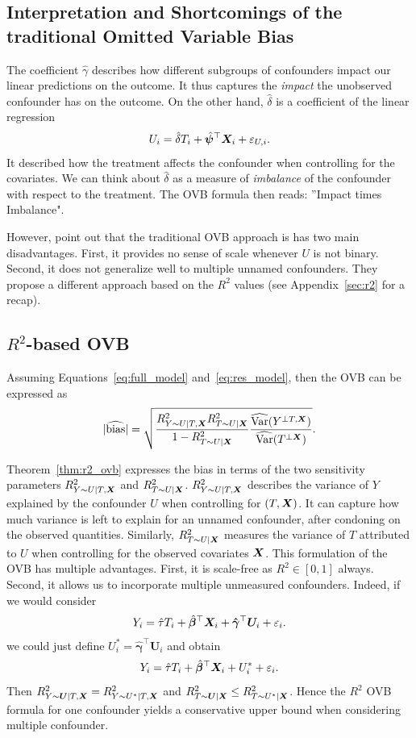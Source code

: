 \documentclass[11pt]{exam}
\begin{document}
\subsection{Interpretation and Shortcomings of the traditional Omitted Variable Bias}
The coefficient $\hat \gamma$ describes how different subgroups of confounders impact our linear predictions on the outcome. It thus captures the \emph{impact} the unobserved confounder has on the outcome.
On the other hand, $\hat \delta$ is a coefficient of the linear regression
\[
    U_i = \hat \delta T_i + \hat{\bm{\psi}}^\top \bm{X}_i + \varepsilon_{U, i}.
\]
It described how the treatment affects the confounder when controlling for the covariates. We can think about $\hat \delta$ as a measure of \emph{imbalance} of the confounder with respect to the treatment. The OVB formula then reads: ''Impact times Imbalance".

However, \citet{cinelli2020making} point out that the traditional OVB approach is has two main disadvantages. First, it provides no sense of scale whenever $U$ is not binary. Second, it does not generalize well to multiple unnamed confounders. They propose a different approach based on the $R^2$ values (see Appendix~\ref{sec:r2} for a recap).

\subsection{$R^2$-based OVB}
\begin{theorem}\label{thm:r2_ovb}
    Assuming Equations~\eqref{eq:full_model} and~\eqref{eq:res_model}, then the OVB can be expressed as
    \[
        |\widehat{\mathrm{bias}}| = \sqrt{\frac{R^2_{Y \sim U \mid T, \bm{X}} R^2_{T \sim U \mid\bm{X}}}{1 - R^2_{T \sim U \mid\bm{X}}} \frac{\widehat{\mathrm{Var}}(Y^{\perp T, \bm{X}})}{\widehat{\mathrm{Var}}(T^{\perp \bm{X}})}}.
    \]
\end{theorem}
Theorem~\ref{thm:r2_ovb} expresses the bias in terms of the two sensitivity parameters $R^2_{Y \sim U \mid T, \bm{X}}$ and $R^2_{T \sim U \mid\bm{X}}$. $R^2_{Y \sim U \mid T, \bm{X}}$ describes the variance of $Y$ explained by the confounder $U$ when controlling for $(T, \bm{X})$. It can capture how much variance is left to explain for an unnamed confounder, after condoning on the observed quantities. Similarly, $R^2_{T \sim U \mid\bm{X}}$ measures the variance of $T$ attributed to $U$ when controlling for the observed covariates $\bm{X}$.
This formulation of the OVB has multiple advantages. First, it is scale-free as $R^2 \in [0, 1]$ always. Second, it allows us to incorporate multiple unmeasured confounders. Indeed, if we would consider 
\[
    Y_i = \hat \tau T_i + \hat{\bm{\beta}}^\top \bm{X}_i + \bm{\hat{\gamma}}^\top \bm{U}_i + \varepsilon_i.
\]
we could just define $U_i^\ast = \bm{\hat{\gamma}}^\top \bm{U}_i$ and obtain
\[
    Y_i = \hat \tau T_i + \hat{\bm{\beta}}^\top \bm{X}_i + U_i^\ast + \varepsilon_i.
\]
Then $R^2_{Y \sim \bm{U} \mid T, \bm{X}} = R^2_{Y \sim U^\ast \mid T, \bm{X}}$ and $R^2_{T \sim \bm{U} \mid\bm{X}} \leq R^2_{T \sim U^\ast \mid\bm{X}}$. Hence the $R^2$ OVB formula for one confounder yields a conservative upper bound when considering multiple confounder.
\end{document}
